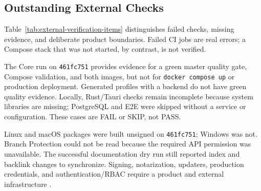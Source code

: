 \subsection{Outstanding External Checks}
\label{subsec:extern-verbleibende-pruefungen}

Table~\ref{tab:external-verification-items} distinguishes failed checks,
missing evidence, and deliberate product boundaries. Failed CI jobs are real
errors; a Compose stack that was not started, by contrast, is not verified.

The Core run on \texttt{461fc751} provides evidence for a green master quality
gate, Compose validation, and both images, but not for
\texttt{docker compose up} or production deployment. Generated profiles with
a backend do not have green quality evidence. Locally, Rust/Tauri checks remain
incomplete because system libraries are missing; PostgreSQL and E2E were
skipped without a service or configuration. These cases are FAIL or SKIP, not
PASS.

Linux and macOS packages were built unsigned on \texttt{461fc751}; Windows was
not. Branch Protection could not be read because the required API permission
was unavailable. The successful documentation dry run still reported index
and backlink changes to synchronize. Signing, notarization, updaters,
production credentials, and authentication/RBAC require a product and
external infrastructure
\parencite{kleiveist2026governance-core-run,kleiveist2026governance-desktop-run,kleiveist2026release}.


